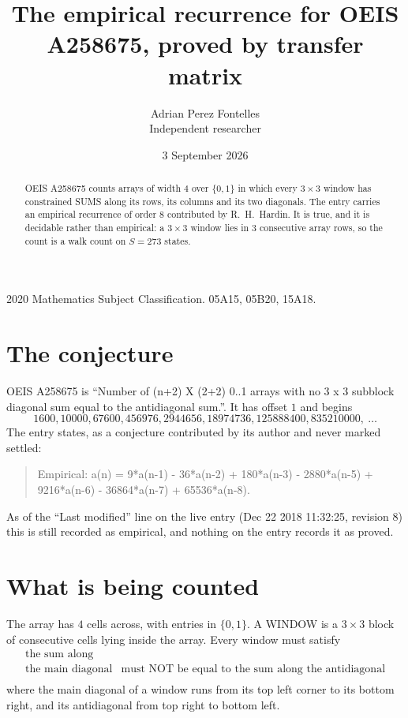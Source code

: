 \documentclass[11pt,a4paper]{article}
\title{The empirical recurrence for OEIS A258675, proved by transfer matrix}
\author{Adrian Perez Fontelles\\ \small Independent researcher}
\date{3 September 2026}
\theoremstyle{plain}
\theoremstyle{definition}
\begin{document}
\maketitle

\begin{abstract}
OEIS A258675 counts arrays of width $4$ over $\{0,1\}$ in which every $3\times3$ window has
constrained SUMS along its rows, its columns and its two diagonals. The entry carries an
empirical recurrence of order $8$ contributed by R.~H.~Hardin. It is true, and it is
decidable rather than empirical: a $3\times3$ window lies in $3$ consecutive array rows,
so the count is a walk count on $S=273$ states.
\end{abstract}

\noindent\small 2020 Mathematics Subject Classification. 05A15, 05B20, 15A18.\normalsize

\section{The conjecture}

OEIS A258675 is ``Number of (n+2) X (2+2) 0..1 arrays with no 3 x 3 subblock diagonal sum equal to the antidiagonal sum.''. It has offset $1$ and begins
\[
1600, 10000, 67600, 456976, 2944656, 18974736, 125888400, 835210000,\ \dots
\]
The entry states, as a conjecture contributed by its author and never marked settled:
\begin{quote}
Empirical: a(n) = 9*a(n-1) - 36*a(n-2) + 180*a(n-3) - 2880*a(n-5) + 9216*a(n-6) - 36864*a(n-7) + 65536*a(n-8).
\end{quote}
As of the ``Last modified'' line on the live entry (Dec 22 2018 11:32:25, revision 8) this is still
recorded as empirical, and nothing on the entry records it as proved.

\section{What is being counted}

The array has $4$ cells across, with entries in $\{0,1\}$. A WINDOW is a $3\times3$ block
of consecutive cells lying inside the array. Every window must satisfy
\[
\begin{array}{ll}
\text{the sum along} & \text{} \\[2pt]
\text{the main diagonal} & \text{must NOT be equal to the sum along the antidiagonal} \\
\end{array}
\]
where the main diagonal of a window runs from its top left corner to its bottom right, and its
antidiagonal from top right to bottom left.
\end{document}
